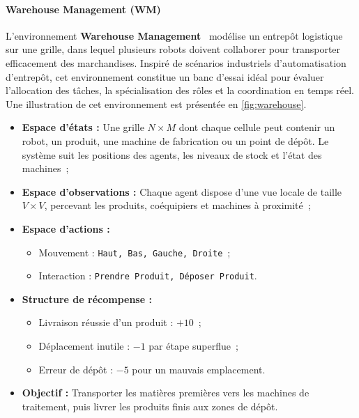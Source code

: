 \paragraph{Warehouse Management (WM)}

L'environnement \textbf{Warehouse Management}~\cite{warehouse_management} modélise un entrepôt logistique sur une grille, dans lequel plusieurs robots doivent collaborer pour transporter efficacement des marchandises. Inspiré de scénarios industriels d'automatisation d'entrepôt, cet environnement constitue un banc d'essai idéal pour évaluer l'allocation des tâches, la spécialisation des rôles et la coordination en temps réel. Une illustration de cet environnement est présentée en \autoref{fig:warehouse}.

\begin{itemize}
    \item \textbf{Espace d'états :} Une grille $N \times M$ dont chaque cellule peut contenir un robot, un produit, une machine de fabrication ou un point de dépôt. Le système suit les positions des agents, les niveaux de stock et l'état des machines~;
    \item \textbf{Espace d'observations :} Chaque agent dispose d'une vue locale de taille $V \times V$, percevant les produits, coéquipiers et machines à proximité~;
    \item \textbf{Espace d'actions :}
          \begin{itemize}
              \item Mouvement : \texttt{Haut, Bas, Gauche, Droite}~;
              \item Interaction : \texttt{Prendre Produit, Déposer Produit}.
          \end{itemize}
    \item \textbf{Structure de récompense :}
          \begin{itemize}
              \item Livraison réussie d'un produit : $+10$~;
              \item Déplacement inutile : $-1$ par étape superflue~;
              \item Erreur de dépôt : $-5$ pour un mauvais emplacement.
          \end{itemize}
    \item \textbf{Objectif :} Transporter les matières premières vers les machines de traitement, puis livrer les produits finis aux zones de dépôt.
\end{itemize}

